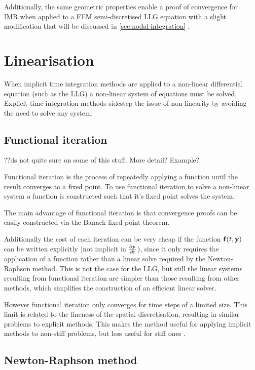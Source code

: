 Additionally, the same geometric properties enable a proof of convergence for IMR when applied to a FEM semi-discretised LLG equation with a slight modification that will be discussed in \cref{sec:nodal-integration} \cite{Bartels2006}.


\section{Linearisation}
\label{sec:linearisation}

When implicit time integration methods are applied to a non-linear differential equation (such as the LLG) a non-linear system of equations must be solved.
Explicit time integration methods sidestep the issue of non-linearity by avoiding the need to solve any system.


\subsection{Functional iteration}
\label{sec:picard}

??ds not quite sure on some of this stuff. More detail? Example?

Functional iteration is the process of repeatedly applying a function until the result converges to a fixed point.
To use functional iteration to solve a non-linear system a function is constructed such that it's fixed point solves the system.

The main advantage of functional iteration is that convergence proofs can be easily constructed via the Banach fixed point theorem.

Additionally the cost of each iteration can be very cheap if the function ${\mathbf{f}}(t, \mathbf{y})$ can be written explicitly (\ie not implicit in $\frac{\partial \mathbf{y}}{\partial t}$), since it only requires the application of a function rather than a linear solve required by the Newton-Raphson method.
This is not the case for the LLG, but still the linear systems resulting from functional iteration are simpler than those resulting from other methods, which simplifies the construction of an efficient linear solver.

However functional iteration only converges for time steps of a limited size.
This limit is related to the fineness of the spatial discretisation, resulting in similar problems to explicit methods.
This makes the method useful for applying implicit methods to non-stiff problems, but less useful for stiff ones \cite{Iserles2009}.


\subsection{Newton-Raphson method}
\label{sec:newt-raph}

